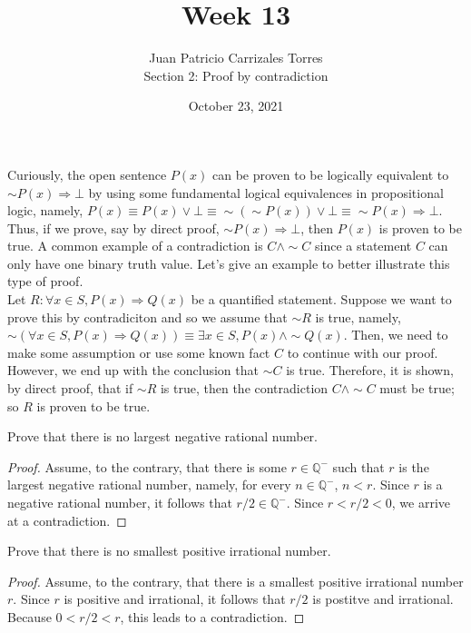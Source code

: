 \documentclass[12pt]{article}
\newcommand{\Q}{\mathbb{Q}}
\newenvironment{problem}[2][Problem]{\begin{trivlist}
		\item[\hskip \labelsep {\bfseries #1}\hskip \labelsep {\bfseries #2.}]}{\end{trivlist}}
\begin{document}
	
	\title{Week 13}
	\author{Juan Patricio Carrizales Torres \\
		Section 2: Proof by contradiction}
	\date{October 23, 2021}
	\maketitle

	Curiously, the open sentence $P(x)$ can be proven to be logically equivalent to $\sim P(x) \Rightarrow \bot$ by using some fundamental logical equivalences in propositional logic, namely, $P(x) \equiv P(x)\vee \bot \equiv \sim (\sim P(x))\vee \bot \equiv \sim P(x) \Rightarrow \bot$. Thus, if we prove, say by direct proof, $\sim P(x) \Rightarrow \bot$, then $P(x)$ is proven to be true. A common example of a contradiction is $C \wedge \sim C$ since a statement $C$ can only have one binary truth value. Let's give an example to better illustrate this type of proof.\\
	
	Let $R: \forall x\in S, P(x) \Rightarrow Q(x)$ be a quantified statement. Suppose we want to prove this by contradiciton and so we assume that $\sim R$ is true, namely, $\sim (\forall x \in S, P(x) \Rightarrow Q(x)) \equiv \exists x \in S, P(x)\wedge \sim Q(x)$. Then, we need to make some assumption or use some known fact $C$ to continue with our proof. However, we end up with the conclusion that $\sim C$ is true. Therefore, it is shown, by direct proof, that if $\sim R$ is true, then the contradiction $C\wedge \sim C$ must be true; so $R$ is proven to be true.
	
	\begin{problem}{10}
		Prove that there is no largest negative rational number.
		\begin{proof}
			Assume, to the contrary, that there is some $r\in \Q^{-}$ such that $r$ is the largest negative rational number, namely, for every $n\in \Q^{-}$, $n<r$. Since $r$ is a negative rational number, it follows that $r/2\in \Q^{-}$. Since $r<r/2<0$, we arrive at a contradiction.
		\end{proof}
	\end{problem}

	\begin{problem}{11}
		Prove that there is no smallest positive irrational number.
		\begin{proof}
			Assume, to the contrary, that there is a smallest positive irrational number $r$. Since $r$ is positive and irrational, it follows that $r/2$ is postitve and irrational. Because $0<r/2<r$, this leads to a contradiction.
		\end{proof}
	\end{problem}
\end{document}
